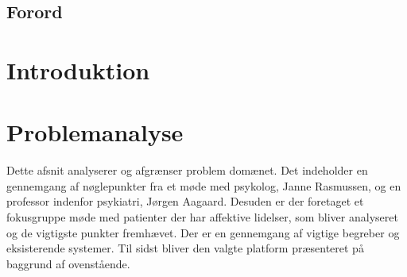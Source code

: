 %
%
%
%
% 



\pagestyle{empty} %
%
%

\cleardoublepage

\section*{Forord}

\cleardoublepage

\pagestyle{fancy} %
\setcounter{tocdepth}{1}
\tableofcontents
\listoftodos
%
\cleardoublepage

\chapter*{Introduktion}


\chapter{Problemanalyse}
Dette afsnit analyserer og afgrænser problem domænet.
Det indeholder en gennemgang af nøglepunkter fra et møde med psykolog, Janne Rasmussen, og en professor indenfor psykiatri, Jørgen Aagaard.
Desuden er der foretaget et fokusgruppe møde med patienter der har affektive lidelser, som bliver analyseret og de vigtigste punkter fremhævet.
Der er en gennemgang af vigtige begreber og eksisterende systemer.
Til sidst bliver den valgte platform præsenteret på baggrund af ovenstående.

